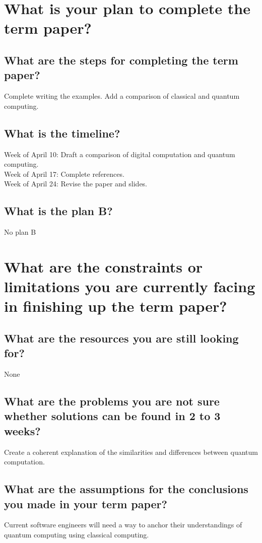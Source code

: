 \documentclass{article}
\begin{document}
\section{What is your plan to complete the term paper?}
\subsection{What are the steps for completing the term paper?}
Complete writing the examples. Add a comparison of classical and quantum computing. 

\subsection{What is the timeline?}
Week of April 10: Draft a comparison of digital computation and quantum computing. \\
Week of April 17: Complete references. \\
Week of April 24: Revise the paper and slides. \\

\subsection{What is the plan B?}
No plan B

\section{What are the constraints or limitations you are currently facing in finishing up the term paper?}
\subsection{What are the resources you are still looking for?}
None
\subsection{What are the problems you are not sure whether solutions can be found in 2 to 3 weeks?}
Create a coherent explanation of the similarities and differences between quantum computation. 

\subsection{What are the assumptions for the conclusions you made in your term paper?}
Current software engineers will need a way to anchor their understandings of quantum computing using classical computing. 
\end{document}
